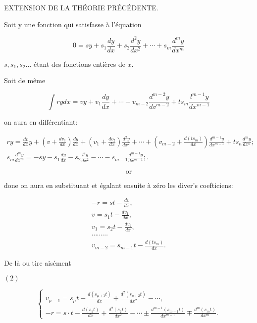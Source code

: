 \documentclass{article}
\begin{document}
EXTENSION DE LA THÉORIE PRÉCÉDENTE.

Soit y une fonction qui satisfasse à l'équation

\[
0=s y+s_{1} \frac{d y}{d x}+s_{2} \frac{d^{2} y}{d x^{2}}+\cdots+s_{m} \frac{d^{m} y}{d x^{m}}
\]

\(s, s_{1}, s_{2} \ldots\) étant des fonctions entières de \(x\).

Soit de même

\[
\int r y d x=v y+v_{1} \frac{d y}{d x}+\cdots+v_{m-2} \frac{d^{m-2} y}{d v^{m-2}}+t s_{m} \frac{l^{m-1} y}{d x^{m-1}}
\]

on aura en différentiant:

\[
\begin{gathered}
r y=\frac{d v}{d x} y+\left(v+\frac{d v_{1}}{d x}\right) \frac{d y}{d x}+\left(v_{1}+\frac{d v_{2}}{d x}\right) \frac{d^{2} y}{d x^{2}}+\cdots+\left(v_{m-2}+\frac{d\left(t s_{m}\right)}{d x}\right) \frac{d^{m-1} y}{d x^{m-1}}+t s_{n} \frac{d^{m} y}{d x^{n}} ; \\
s_{m} \frac{d^{m} y}{d x^{m}}=-s y-s_{1} \frac{d y}{d x}-s_{2} \frac{l^{2} y}{d x^{2}}-\cdots-s_{m-1} \frac{d^{m-1} y}{d x^{m-1}} ; .
\end{gathered}
\]

\[
\mathrm{or}
\]

done on aura en substituant et égalant ensuite à zéro les diver's coefticiens:

\[
\begin{gathered}
-r=s t-\frac{d v}{d x}, \\
v=s_{1} t-\frac{d v_{1}}{d x}, \\
v_{1}=s_{2} t-\frac{d v_{2}}{d x}, \\
\cdots \cdots \cdots \\
v_{m-2}=s_{m-1} t-\frac{d\left(t s_{m}\right)}{d x} .
\end{gathered}
\]

De là ou tire aisément

\((2)\)

\[
\left\{\begin{array}{c}
v_{\mu-1}=s_{\mu} t-\frac{d\left(s_{\mu+1} t\right)}{d x}+\frac{d^{2}\left(s_{\mu+2} t\right)}{d x^{2}}-\cdots, \\
-r=s \cdot t-\frac{d\left(s_{1} t\right)}{d x}+\frac{d^{2}\left(s_{2} t\right)}{d x^{2}}-\cdots \pm \frac{d^{m-1}\left(s_{m-1} t\right)}{d x^{m-1}} \mp \frac{d^{m}\left(s_{m} t\right)}{d x^{m}} .
\end{array}\right.
\]
\end{document}
